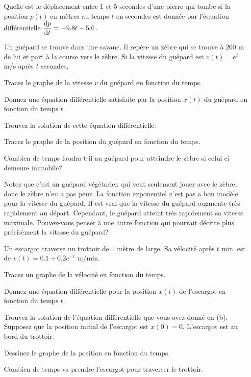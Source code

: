 \begin{question}
Quelle est le déplacement entre $1$ et $5$ secondes d'une pierre qui tombe si
la position $p(t)$ en mètres au temps $t$ en secondes est donnée par
l'équation différentielle $\displaystyle \frac{\mathrm{d}p}{\mathrm{d}t} = -9.8 t - 5.0$. 
\label{10Q5}
\end{question}

\begin{question}[\life]
Un guépard se trouve dans une savane.  Il repère un zèbre qui se trouve à
$200$ m de lui et part à la course vers le zèbre.  Si la vitesse du guépard
est $v(t) = e^t$ m/s après $t$ secondes,

 Tracez le graphe de la vitesse $v$ du guépard en fonction du
temps.

 Donnez une équation différentielle satisfaite par la position
$x(t)$ du guépard en fonction du temps $t$.

 Trouvez la solution de cette équation différentielle.

 Tracez le graphe de la position du guépard en fonction du temps.

 Combien de temps faudra-t-il au guépard pour atteindre le zèbre si
celui ci demeure immobile?

Notez que c'est un guépard végétarien qui veut seulement jouer avec le
zèbre, donc le zèbre n'en a pas peur.  La fonction exponentiel n'est
pas a bon modèle pour la vitesse du guépard.  Il est vrai que la
vitesse du guépard augmente très rapidement au départ.  Cependant, le
guépard atteint très rapidement sa vitesse maximale.  Pouvez-vous
penser à une autre fonction qui pourrait décrire plus précisément la
vitesse du guépard? 
\label{10Q6}
\end{question}

\begin{question}[\life]
Un escargot traverse un trottoir de $1$ mètre de large.  Sa vélocité après
$t$ min. est de $v(t) = 0.1+ 0.2 e^{-t}$ m/min. 

 Tracez un graphe de la vélocité en fonction du temps.

 Donnez une équation différentielle pour la position $x(t)$ de
l'escargot en fonction du temps $t$.

 Trouvez la solution de l'équation différentielle que vous avez donné
en (b).  Supposez que la position initial de l'escargot
est $x(0)=0$.  L'escargot est au bord du trottoir.

 Dessinez le graphe de la position en fonction du temps.

 Combien de temps va prendre l'escargot pour traverser le trottoir.
\label{10Q7}
\end{question}

